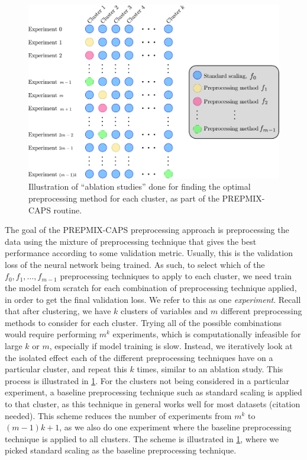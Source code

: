 \documentclass{statsmsc}
\begin{document}
{\begin{figure}[htp]
    \begin{center}
        \includegraphics[width=\textwidth]{diagrams/prepmix-diagram.pdf}
    \end{center}
    \caption{Illustration of ``ablation studies'' done for finding the optimal preprocessing method
    for each cluster, as part of the \ac{PREPMIX-CAPS} routine.}
    \label{fig:prepmix}
\end{figure}

The goal of the \ac{PREPMIX-CAPS} preprocessing approach is preprocessing the
data using the mixture of preprocessing technique that gives the best
performance according to some validation metric. Usually, this is the
validation loss of the neural network being trained. As such, to select which
of the $f_0, f_1,\dots,f_{m-1}$ preprocessing techniques to apply to each
cluster, we need train the model from scratch for each combination of
preprocessing technique applied, in order to get the final validation loss.
We refer to this as one \textit{experiment}.
Recall that after clustering, we have $k$ clusters of variables and $m$ different
preprocessing methods to consider for each cluster. Trying all of the possible
combinations would require performing $m^k$ experiments, which is
computationally infeasible for large $k$ or $m$, especially if model training
is slow. Instead, we iteratively look at the isolated effect each of the
different preprocessing techniques have on a particular cluster, and repeat
this $k$ times, similar to an ablation study. This process is illustrated in
\cref{fig:prepmix}. For the clusters not being
considered in a particular experiment, a baseline preprocessing technique such
as standard scaling is applied to that cluster, as this technique in general
works well for most datasets (citation needed). This scheme reduces the number
of experiments from $m^k$ to $(m-1)k+1$, as we also do one experiment where the
baseline preprocessing technique is applied to all clusters. The scheme is
illustrated in \cref{fig:prepmix}, where we picked standard scaling as the
baseline preprocessing technique.

}
\end{document}
